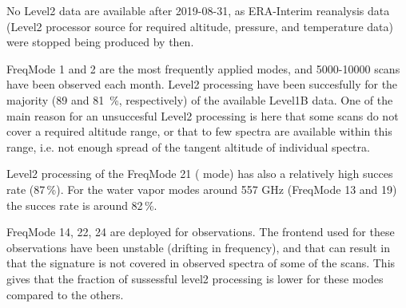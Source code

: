 No Level2 data are available after 2019-08-31, as 
ERA-Interim reanalysis data (Level2 processor source for
required altitude, pressure, and temperature data)
were stopped being produced by then.

FreqMode 1 and 2
are the most frequently applied modes, and 5000-10000 scans have been
observed each month. Level2 processing have been succesfully
for the majority (89 and 81 \,\%, respectively) of the available Level1B data.
One of the main reason for an unsuccesful Level2 processing is here
that some scans do not cover a required altitude range,
or that to few spectra are available within this range,
i.e. not enough spread of the tangent altitude of individual spectra. 

Level2 processing of the FreqMode 21 ( mode) has also
a relatively high succes rate (87\,\%).
For the water vapor modes around 557 GHz (FreqMode
13 and 19) the succes rate is around 82\,\%.
 
FreqMode 14, 22, 24 are deployed for  observations.
The frontend used for these observations have been unstable
(drifting in frequency), and that can result in that the 
 signature is not covered in observed spectra 
of some of the scans. This gives that the fraction of
sussessful level2 processing is lower for these modes
compared to the others.
 

